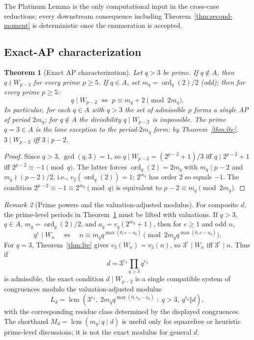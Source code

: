 \documentclass[11pt]{amsart}
\theoremstyle{plain}
\newtheorem{theorem}{Theorem}[section]
\theoremstyle{definition}
\theoremstyle{remark}
\newtheorem{remark}[theorem]{Remark}
\numberwithin{equation}{section}
\newcommand{\ord}{\operatorname{ord}}
\begin{document}
The Platinum Lemma is the only computational input in the cross-case reductions; every downstream consequence including Theorem~\ref{thm:second-moment} is deterministic once the enumeration is accepted.

\subsection{Exact-AP characterization}

\begin{theorem}[Exact AP characterization]\label{thm:exact-ap}
Let $q>3$ be prime. If $q\notin A$, then $q\nmid W_{p-2}$ for every prime $p\geq5$. If $q\in A$, set $m_q=\ord_q(2)/2$ (odd); then for every prime $p\geq5$:
\[
  q \mid W_{p-2} \;\Longleftrightarrow\; p \equiv m_q + 2 \pmod{2 m_q}.
\]
In particular, for each $q \in A$ with $q > 3$ the set of admissible $p$ forms a single AP of period $2 m_q$; for $q \notin A$ the divisibility $q \mid W_{p-2}$ is impossible. The prime $q = 3 \in A$ is the lone exception to the period-$2 m_q$ form: by Theorem~\ref{thm:lte}, $3 \mid W_{p-2}$ iff $3 \mid p - 2$.
\end{theorem}

\begin{proof}
Since $q > 3$, $\gcd(q, 3) = 1$, so $q \mid W_{p-2} = (2^{p-2}+1)/3$ iff $q \mid 2^{p-2} + 1$ iff $2^{p-2} \equiv -1 \pmod q$. The latter forces $\ord_q(2) = 2 m_q$ with $m_q \mid p - 2$ and $m_q \nmid (p - 2)/2$, i.e., $v_2(\ord_q(2)) = 1$; $2^{m_q}$ has order 2 so equals $-1$. The condition $2^{p-2} \equiv -1 \equiv 2^{m_q} \pmod q$ is equivalent to $p - 2 \equiv m_q \pmod{2 m_q}$.
\end{proof}

\begin{remark}[Prime powers and the valuation-adjusted modulus]\label{rem:valuation-adjusted-Ld}
For composite $d$, the prime-level periods in Theorem~\ref{thm:exact-ap} must be lifted with valuations. If $q>3$, $q\in A$, $m_q=\ord_q(2)/2$, and $a_q=v_q(2^{m_q}+1)$, then for $e\geq1$ and odd $n$,
\[
  q^e \mid W_n
  \quad\Longleftrightarrow\quad
  n \equiv m_q q^{\max(0,e-a_q)}
  \pmod{2m_q q^{\max(0,e-a_q)}}.
\]
For $q=3$, Theorem~\ref{thm:lte} gives $v_3(W_n)=v_3(n)$, so $3^e\mid W_n$ iff $3^e\mid n$. Thus if
\[
  d=3^{e_3}\prod_{q>3}q^{e_q}
\]
is admissible, the exact condition $d\mid W_{p-2}$ is a single compatible system of congruences modulo the valuation-adjusted modulus
\[
  L_d=\operatorname{lcm}\!\left(
    3^{e_3},
    \;2m_q q^{\max(0,e_q-a_q)} \;:\; q>3,\ q^{e_q}\Vert d
  \right),
\]
with the corresponding residue class determined by the displayed congruences. The shorthand $M_d=\operatorname{lcm}(m_q:q\mid d)$ is useful only for squarefree or heuristic prime-level discussions; it is not the exact modulus for general $d$.
\end{remark}
\end{document}
